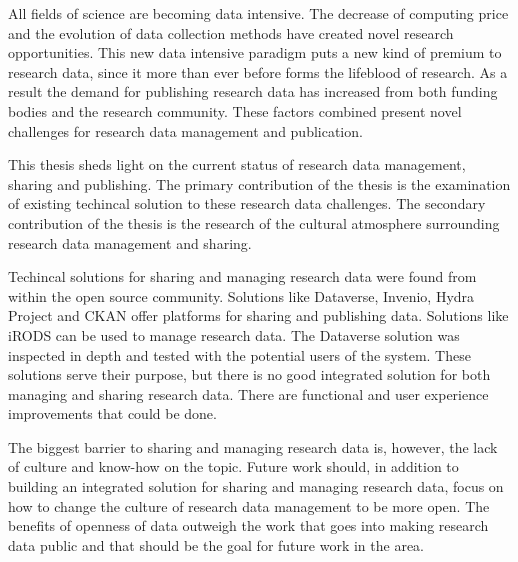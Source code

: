 All fields of science are becoming data intensive. The decrease of computing
price and the evolution of data collection methods have created novel research
opportunities. This new data intensive paradigm
puts a new kind of premium to research data, since it more than ever before
forms the lifeblood of research. As a result the demand for publishing
research data has increased from both funding bodies and the research
community. These factors combined present novel challenges for research data
management and publication.

This thesis sheds light on the current status of research data management,
sharing and publishing. The primary contribution of the thesis is the
examination of existing techincal solution to these research data challenges.
The secondary contribution of the thesis is the research of the cultural
atmosphere surrounding research data management and sharing.

Techincal solutions for sharing and managing research data were found from
within the open source community. Solutions like Dataverse, Invenio, Hydra
Project and CKAN offer platforms for sharing and publishing data. Solutions
like iRODS can be used to manage research data. The Dataverse solution was
inspected in depth and tested with the potential users of the system. These solutions serve
their purpose, but there is no good integrated solution for both managing and
sharing research data. There are functional and user experience
improvements that could be done.

The biggest barrier to sharing and managing research data is, however, the
lack of culture and know-how on the topic. Future work should, in addition to
building an integrated solution for sharing and managing research data, focus
on how to change the culture of research data management to be more open. The
benefits of openness of data outweigh the work that goes into making research
data public and that should be the goal for future work in the area.


